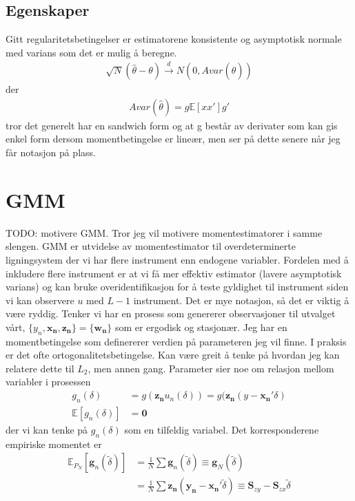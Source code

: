\subsection{Egenskaper}
Gitt regularitetsbetingelser er estimatorene konsistente og asymptotisk normale med varians som det er mulig å beregne.
\begin{align}
\sqrt{N}(\hat{\theta}-\theta) \overset{d}{\to} N(0,Avar(\hat{\theta}))
\end{align} 
der 
\begin{align}
Avar(\hat{\theta}) = g\mathbb{E}[xx']g'
\end{align} 
tror det generelt har en sandwich form og at g består av derivater som kan gis enkel form dersom momentbetingelse er lineær, men ser på dette senere når jeg får notasjon på plass.


\section{GMM}
TODO: motivere GMM. Tror jeg vil motivere momentestimatorer i samme slengen.
GMM er utvidelse av momentestimator til overdeterminerte ligningsystem der vi har flere instrument enn endogene variabler. Fordelen med å inkludere flere instrument er at vi få mer effektiv estimator (lavere asymptotisk varians) og kan bruke overidentifikasjon for å teste gyldighet til instrument siden vi kan observere $u$ med $L-1$ instrument. Det er mye notasjon, så det er viktig å være ryddig. Tenker vi har en prosess som genererer observasjoner til utvalget vårt, $\{y_n,\mathbf{x_n},\mathbf{z_n}\} = \{\mathbf{w_n}\}$ som er ergodisk og stasjonær. Jeg har en momentbetingelse som definererer verdien på parameteren jeg vil finne. I praksis er det ofte ortogonalitetsbetingelse. Kan være greit å tenke på hvordan jeg kan relatere dette til $L_2$, men annen gang. Parameter sier noe om relasjon mellom variabler i prosessen
\begin{align}
g_n(\delta)&=g(\mathbf{z_n}u_n(\delta)) = g(\mathbf{z_n}(y-\mathbf{x_n}'\delta) \\
\mathbb{E}[g_n(\delta)] &= \mathbf{0}
\end{align}
der vi kan tenke på $g_n(\delta)$ som en tilfeldig variabel. Det korresponderene empiriske momentet er
\begin{align}
\mathbb{E}_{P_N}[\mathbf{g}_n(\tilde{\delta})] &= \frac{1}{N}\sum \mathbf{g}_n(\tilde{\delta}) \equiv \mathbf{g}_N(\tilde{\delta}) \\
&= \frac{1}{N} \sum \mathbf{z_n}(\mathbf{y_n}-\mathbf{x_n}'\tilde{\delta}) \equiv \mathbf{S}_{zy} -\mathbf{S}_{zx}\tilde{\delta}
\end{align}
